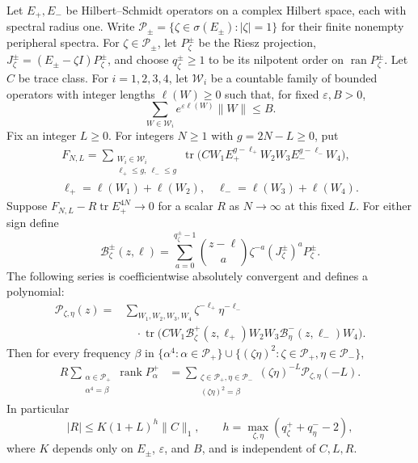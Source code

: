 \begin{lemma}\label{c7:two-gap}
Let $E_+,E_-$ be Hilbert--Schmidt operators on a complex Hilbert space,
each with spectral radius one. Write
$\mathcal P_\pm=\{\zeta\in\sigma(E_\pm):|\zeta|=1\}$ for their finite
nonempty peripheral spectra. For $\zeta\in\mathcal P_\pm$, let
$P_\zeta^\pm$ be the Riesz projection,
$J_\zeta^\pm=(E_\pm-\zeta I)P_\zeta^\pm$, and choose
$q_\zeta^\pm\ge1$ to be its nilpotent order on
$\operatorname{ran}P_\zeta^\pm$.
Let $C$ be trace class. For $i=1,2,3,4$, let $\mathscr W_i$ be a
countable family of bounded operators with integer lengths $\ell(W)\ge0$
such that, for fixed $\varepsilon,B>0$,
\[
 \sum_{W\in\mathscr W_i}e^{\varepsilon\ell(W)}\|W\|\le B.
\]
Fix an integer $L\ge0$. For integers $N\ge1$ with $g=2N-L\ge0$, put
\[
\begin{gathered}
 F_{N,L}=\sum_{\substack{W_i\in\mathscr W_i\\
                \ell_+\le g,\ \ell_-\le g}}
 \operatorname{tr}\bigl(CW_1E_+^{g-\ell_+}W_2W_3
                           E_-^{g-\ell_-}W_4\bigr),\\
 \ell_+=\ell(W_1)+\ell(W_2),\quad
       \ell_-=\ell(W_3)+\ell(W_4).
\end{gathered}
\]
Suppose $F_{N,L}-R\operatorname{tr}E_+^{4N}\to0$ for a scalar $R$ as
$N\to\infty$ at this fixed $L$.
For either sign define
\[
 \mathcal B_\zeta^\pm(z,\ell)=
 \sum_{a=0}^{q_\zeta^\pm-1}
 \binom{z-\ell}{a}\zeta^{-a}(J_\zeta^\pm)^aP_\zeta^\pm.
\]
The following series is coefficientwise absolutely convergent and defines
a polynomial:
\[
\begin{aligned}
 \mathscr P_{\zeta,\eta}(z)={}&
 \sum_{W_1,W_2,W_3,W_4}\zeta^{-\ell_+}\eta^{-\ell_-}\\
 &\quad\cdot\operatorname{tr}\bigl(CW_1\mathcal B_\zeta^+(z,\ell_+)W_2W_3
                              \mathcal B_\eta^-(z,\ell_-)W_4\bigr).
\end{aligned}
\]
Then for every frequency $\beta$ in
$\{\alpha^4:\alpha\in\mathcal P_+\}\cup
 \{(\zeta\eta)^2:\zeta\in\mathcal P_+,\eta\in\mathcal P_-\}$,
\begin{equation}\label{c7:two-gap-frequency}
\begin{aligned}
 R\sum_{\substack{\alpha\in\mathcal P_+\\\alpha^4=\beta}}
       \operatorname{rank}P_\alpha^+
 &=\sum_{\substack{\zeta\in\mathcal P_+,\eta\in\mathcal P_-\\
                   (\zeta\eta)^2=\beta}}
       (\zeta\eta)^{-L}\mathscr P_{\zeta,\eta}(-L).
\end{aligned}
\end{equation}
In particular
\[
 |R|\le K(1+L)^h\|C\|_1,
 \qquad h=\max_{\zeta,\eta}(q_\zeta^++q_\eta^--2),
\]
where $K$ depends only on $E_\pm$, $\varepsilon$, and $B$, and is
independent of $C,L,R$.
\end{lemma}

